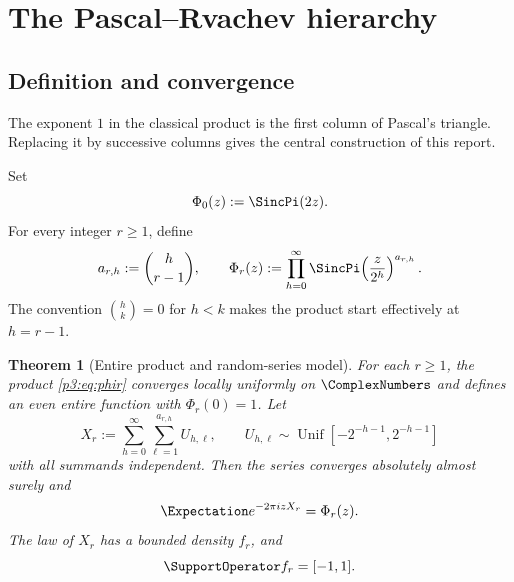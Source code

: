 \documentclass[11pt,oneside]{article}
\newtheorem{theorem}{Theorem}[section]
\theoremstyle{definition}
\theoremstyle{remark}
\begin{document}
\section{The Pascal--Rvachev hierarchy}\label{p3:sec:hierarchy}

\subsection{Definition and convergence}

The exponent $1$ in the classical product is the first column of Pascal's triangle.  Replacing it by successive columns gives the central construction of this report.

\begin{definition}\label{p3:def:pascal-rvachev}
Set
\begin{equation}\label{p3:eq:phi0}
  \Phi_0(z):=\SincPi(2z).
\end{equation}
For every integer $r\ge1$, define
\begin{equation}\label{p3:eq:phir}
  a_{r,h}:=\binom h{r-1},
  \qquad
  \Phi_r(z):=\prod_{h=0}^{\infty}
  \SincPi\!\left(\frac z{2^h}\right)^{a_{r,h}}.
\end{equation}
The convention $\binom hk=0$ for $h<k$ makes the product start effectively at $h=r-1$.
\end{definition}

\begin{theorem}[Entire product and random-series model]\label{p3:thm:random-series}
For each $r\ge1$, the product \eqref{p3:eq:phir} converges locally uniformly on $\ComplexNumbers$ and defines an even entire function with $\Phi_r(0)=1$.  Let
\begin{equation}\label{p3:eq:Xr}
  X_r:=\sum_{h=0}^{\infty}\sum_{\ell=1}^{a_{r,h}}U_{h,\ell},
  \qquad
  U_{h,\ell}\sim\operatorname{Unif}
  \!\left[-2^{-h-1},2^{-h-1}\right]
\end{equation}
with all summands independent.  Then the series converges absolutely almost surely and
\begin{equation}\label{p3:eq:char-Xr}
  \Expectation e^{-2\pi i zX_r}=\Phi_r(z).
\end{equation}
The law of $X_r$ has a bounded density $f_r$, and
\begin{equation}\label{p3:eq:support}
  \SupportOperator f_r=[-1,1].
\end{equation}
\end{theorem}
\end{document}
